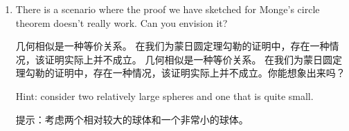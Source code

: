 \begin{enumerate}
    \item There is a scenario where the proof we have sketched for
    Monge's circle theorem doesn't really work.
    Can you envision it?

    几何相似是一种等价关系。 在我们为蒙日圆定理勾勒的证明中，存在一种情况，该证明实际上并不成立。 几何相似是一种等价关系。 在我们为蒙日圆定理勾勒的证明中，存在一种情况，该证明实际上并不成立。你能想象出来吗？

    Hint: consider two relatively large spheres and one that is quite
    small.
    
    提示：考虑两个相对较大的球体和一个非常小的球体。
    \end{enumerate}
    
    
    
